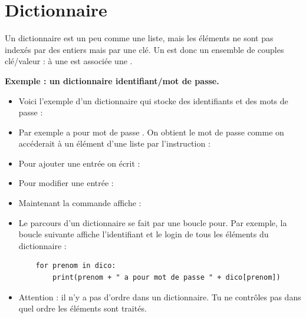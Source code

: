 \documentclass[11pt,class=report,crop=false]{standalone}
\begin{document}
\section{Dictionnaire}

Un dictionnaire est un peu comme une liste, mais les éléments ne sont pas indexés par des entiers mais par une \og{}clé\fg{}. Un  est donc un ensemble de couples clé/valeur : à une  est associée une .

\medskip

\textbf{Exemple : un dictionnaire identifiant/mot de passe.}

\begin{itemize}
	\item Voici l'exemple d'un dictionnaire  qui stocke des identifiants et des mots de passe : 
	
	\item Par exemple  a pour mot de passe . On obtient le mot de passe
	comme on accéderait à un élément d'une liste par l'instruction :
	
	\item Pour ajouter une entrée on écrit : 
	
	\item Pour modifier une entrée : 
	
	\item Maintenant la commande  affiche :
	
	\item Le parcours d'un dictionnaire se fait par une boucle \og{}pour\fg{}. Par exemple, la boucle suivante affiche l'identifiant et le login de tous les éléments du dictionnaire :
	\begin{lstlisting}
	for prenom in dico:
	    print(prenom + " a pour mot de passe " + dico[prenom])
	\end{lstlisting}
	
	\item Attention : il n'y a pas d'ordre dans un dictionnaire. Tu ne contrôles pas dans quel ordre les éléments sont traités.
\end{itemize}
\end{document}

